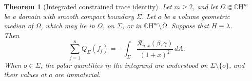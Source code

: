 \documentclass[11pt,reqno]{amsart}
\numberwithin{equation}{section}
\newtheorem{theorem}{Theorem}[section]
\theoremstyle{definition}
\theoremstyle{remark}
\newcommand{\CH}{\mathbb{C}\mathrm{H}}
\begin{document}
\begin{theorem}[Integrated constrained trace identity]
\label{thm:integrated-trace}
Let \(m\ge 2\), and let \(\Omega\Subset\CH^m\) be a domain with smooth
compact boundary \(\Sigma\).  Let \(o\) be a volume geometric median of
\(\Omega\), which may lie in \(\Omega\), on \(\Sigma\), or in
\(\CH^m\setminus\overline{\Omega}\). Suppose that
\(H\equiv\lambda\). Then
\begin{equation}
\sum_{j=1}^n Q_\Sigma(f_j)
=
-\int_\Sigma
\frac{\mathcal R_{n,x}(\beta,\gamma)}{(1+x)^2}\,dA.
\label{eq:integrated-trace}
\end{equation}
When \(o\in\Sigma\), the polar quantities in the integrand are understood
on \(\Sigma\setminus\{o\}\), and their values at \(o\) are immaterial.
\end{theorem}
\end{document}
